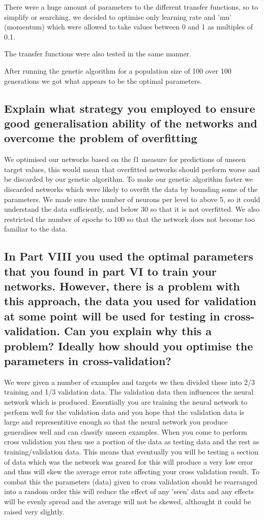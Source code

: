 \documentclass[11pt]{article}
\begin{document}
There were a huge amount of parameters to the different transfer functions, so to simplify or searching, we decided to optimise only learning rate and 'mu' (momentum) which were allowed to take values between 0 and 1 as multiples of 0.1.

The transfer functions were also tested in the same manner.

After running the genetic algorithm for a population size of 100 over 100 generations we got 
what appears to be the optimal parameters.





\subsection{Explain what strategy you employed to ensure good generalisation ability of the networks and overcome the problem of overfitting}

We optimised our networks based on the f1 measure for predictions of unseen target values, this would mean that overfitted networks should perform worse and be discarded by our genetic algorithm. To make our genetic algorithm faster we discarded networks which were likely to overfit the data by bounding some of the parameters. We made sure the number of neurons per level to above 5, so it could understand the data sufficiently, and below 30 so that it is not overfitted. We also restricted the number of epochs to 100 so that the network does not become too familiar to the data. 

\subsection{In Part VIII you used the optimal parameters that you found in part VI to train your networks. However, there is a problem with this approach, the data you used for validation at some point will be used for testing in cross-validation. Can you explain why this a problem? Ideally how should you optimise the parameters in cross-validation?}

We were given a number of examples and targets we then divided these into  2/3 training and 1/3 validation data. The validation data then influences the neural network which is produced. Essentially you are training the neural network to perform well for the validation data and you hope that the validation data is large and representitive enough so that the neural network you produce generalises well and can classify unseen examples. When you come to perform cross validation you then use a portion of the data as testing data and the rest as training/validation data. This means that eventually you will be testing a section of data which was the network was geared for this will produce a very low error and thus will skew the average error rate affecting your cross validation result. To combat this the parameters (data) given to cross validation should be rearranged into a random order this will reduce the effect of any 'seen' data and any effects will be evenly spread and the average will not be skewed, althought it could be raised very slightly.
\end{document}
